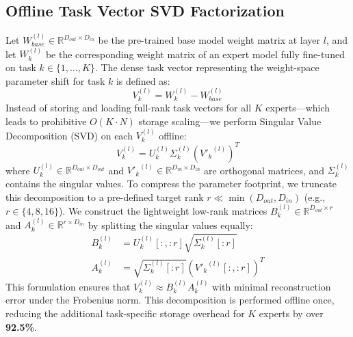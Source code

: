 \subsection{Offline Task Vector SVD Factorization}
Let $W_{base}^{(l)} \in \mathbb{R}^{D_{out} \times D_{in}}$ be the pre-trained base model weight matrix at layer $l$, and let $W_k^{(l)}$ be the corresponding weight matrix of an expert model fully fine-tuned on task $k \in \{1, \dots, K\}$. The dense task vector representing the weight-space parameter shift for task $k$ is defined as:
\begin{equation}
    V_k^{(l)} = W_k^{(l)} - W_{base}^{(l)}
\end{equation}
Instead of storing and loading full-rank task vectors for all $K$ experts—which leads to prohibitive $O(K \cdot N)$ storage scaling—we perform Singular Value Decomposition (SVD) on each $V_k^{(l)}$ offline:
\begin{equation}
    V_k^{(l)} = U_k^{(l)} \Sigma_k^{(l)} ({V'_k}^{(l)})^T
\end{equation}
where $U_k^{(l)} \in \mathbb{R}^{D_{out} \times D_{out}}$ and ${V'_k}^{(l)} \in \mathbb{R}^{D_{in} \times D_{in}}$ are orthogonal matrices, and $\Sigma_k^{(l)}$ contains the singular values. To compress the parameter footprint, we truncate this decomposition to a pre-defined target rank $r \ll \min(D_{out}, D_{in})$ (e.g., $r \in \{4, 8, 16\}$). We construct the lightweight low-rank matrices $B_k^{(l)} \in \mathbb{R}^{D_{out} \times r}$ and $A_k^{(l)} \in \mathbb{R}^{r \times D_{in}}$ by splitting the singular values equally:
\begin{align}
    B_k^{(l)} &= U_k^{(l)}[:, :r] \sqrt{\Sigma_k^{(l)}[:r]} \\
    A_k^{(l)} &= \sqrt{\Sigma_k^{(l)}[:r]} \left( {V'_k}^{(l)}[:, :r] \right)^T
\end{align}
This formulation ensures that $V_k^{(l)} \approx B_k^{(l)} A_k^{(l)}$ with minimal reconstruction error under the Frobenius norm. This decomposition is performed offline once, reducing the additional task-specific storage overhead for $K$ experts by over \textbf{92.5\%}.

